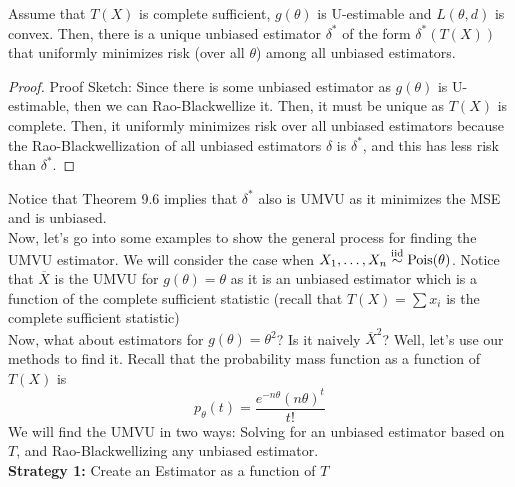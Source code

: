 \begin{theorem}
    Assume that $T(X)$ is complete sufficient, $g(\theta)$ is U-estimable and $L(\theta, d)$ is convex. Then, there is a unique unbiased estimator $\delta^{*}$ of the form $\delta^{*}(T(X))$ that uniformly minimizes risk (over all $\theta$) among all unbiased estimators. 
\end{theorem}
\begin{proof}{Proof Sketch:}
    Since there is some unbiased estimator as $g(\theta)$ is U-estimable, then we can Rao-Blackwellize it. Then, it must be unique as $T(X)$ is complete. Then, it uniformly minimizes risk over all unbiased estimators because the Rao-Blackwellization of all unbiased estimators $\delta$ is $\delta^{*}$, and this has less risk than $\delta^{*}$. 
\end{proof}
Notice that Theorem 9.6 implies that $\delta^{*}$ also is UMVU as it minimizes the MSE and is unbiased.\\

Now, let's go into some examples to show the general process for finding the UMVU estimator. We will consider the case when $X_1, \ldots, X_n \overset{\text{iid}}{\sim} \text{Pois}(\theta)$. Notice that $\overline{X}$ is the UMVU for $g(\theta) = \theta$ as it is an unbiased estimator which is a function of the complete sufficient statistic (recall that $T(X) = \sum x_i$ is the complete sufficient statistic)\\

Now, what about estimators for $g(\theta) = \theta^2$? Is it naively $\overline{X}^2$? Well, let's use our methods to find it. Recall that the probability mass function as a function of $T(X)$ is
\[ p_{\theta}(t) = \frac{e^{-n\theta}(n\theta)^{t}}{t!} \]
We will find the UMVU in two ways: Solving for an unbiased estimator based on $T$, and Rao-Blackwellizing any unbiased estimator.\\

\textbf{Strategy 1:} Create an Estimator as a function of $T$\\


